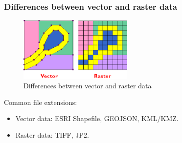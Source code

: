 \documentclass[8.5pt]{beamer}
\begin{document}
\begin{frame}
    \frametitle{Differences between vector and raster data}


    \begin{figure}
        \centering
        \includegraphics[width=0.5\textwidth]{images/vector_raster.png}
        \caption{Differences between vector and raster data}
        \label{fig:differences_vector_raster}
    \end{figure}

    Common file extensions:

    \begin{itemize}
        \item Vector data: ESRI Shapefile, GEOJSON, KML/KMZ.
        \item Raster data: TIFF, JP2.
    \end{itemize}

\end{frame}
\end{document}
